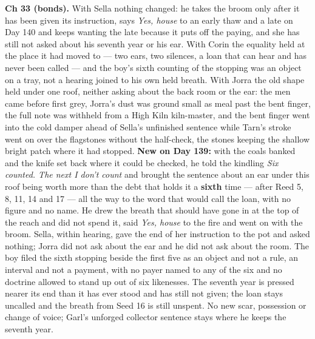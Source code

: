 \documentclass{design/chronicle}
\begin{document}
{\textbf{Ch 33 (bonds).} With Sella nothing changed: he takes the broom only after it has been given its instruction, says \emph{Yes, house} to an early thaw and a late on Day 140 and keeps wanting the late because it puts off the paying, and she has still not asked about his seventh year or his ear. With Corin the equality held at the place it had moved to --- two ears, two silences, a loan that can hear and has never been called --- and the boy’s sixth counting of the stopping was an object on a tray, not a hearing joined to his own held breath. With Jorra the old shape held under one roof, neither asking about the back room or the ear: the men came before first grey, Jorra’s dust was ground small as meal past the bent finger, the full note was withheld from a High Kiln kiln-master, and the bent finger went into the cold damper ahead of Sella’s unfinished sentence while Tarn’s stroke went on over the flagstones without the half-check, the stones keeping the shallow bright patch where it had stopped. \textbf{New on Day 139:} with the coals banked and the knife set back where it could be checked, he told the kindling \emph{Six counted. The next I don’t count} and brought the sentence about an ear under this roof being worth more than the debt that holds it a \textbf{sixth} time --- after Reed 5, 8, 11, 14 and 17 --- all the way to the word that would call the loan, with no figure and no name. He drew the breath that should have gone in at the top of the reach and did not spend it, said \emph{Yes, house} to the fire and went on with the broom. Sella, within hearing, gave the end of her instruction to the pot and asked nothing; Jorra did not ask about the ear and he did not ask about the room. The boy filed the sixth stopping beside the first five as an object and not a rule, an interval and not a payment, with no payer named to any of the six and no doctrine allowed to stand up out of six likenesses. The seventh year is pressed nearer its end than it has ever stood and has still not given; the loan stays uncalled and the breath from Seed 16 is still unspent. No new scar, possession or change of voice; Garl’s unforged collector sentence stays where he keeps the seventh year.

}
\end{document}

